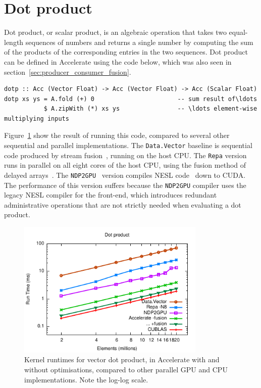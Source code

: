 \section{Dot product}
\label{sec:dotp}

Dot product, or scalar product, is an algebraic operation that takes two
equal-length sequences of numbers and returns a single number by computing the
sum of the products of the corresponding entries in the two sequences. Dot
product can be defined in Accelerate using the code below, which was also seen
in section~\ref{sec:producer_consumer_fusion}.
%
\begin{lstlisting}[style=haskell
    ,label=lst:dotp
    ,caption={Vector dot-product in Accelerate}]
dotp :: Acc (Vector Float) -> Acc (Vector Float) -> Acc (Scalar Float)
dotp xs ys = A.fold (+) 0                       -- sum result of\ldots
           $ A.zipWith (*) xs ys                -- \ldots element-wise multiplying inputs
\end{lstlisting}
%
Figure~\ref{fig:dotp} show the result of running this code, compared to several
other sequential and parallel implementations. The \texttt{Data.Vector} baseline
is sequential code produced by stream
fusion~\cite{Coutts:2007kp}, running on the host CPU. The \texttt{Repa} version
runs in parallel on all eight cores of the host CPU, using the fusion method of
delayed arrays~\cite{Keller:2010er}. The
\texttt{NDP2GPU}~\cite{Bergstrom:2012bi} version compiles NESL
code~\cite{Blelloch:1995ut} down to CUDA. The performance of this version
suffers because the \texttt{NDP2GPU} compiler uses the legacy NESL compiler for
the front-end, which introduces redundant administrative operations that are not
strictly needed when evaluating a dot product.

\begin{figure}
    \begin{center}
        \includegraphics[width=0.8\textwidth]{images/sec-6/dotp/dotp}
    \end{center}
    \caption[Vector dot product kernel benchmarks]{Kernel runtimes for vector
        dot product, in Accelerate with and without optimisations, compared to
        other parallel GPU and CPU implementations. Note the log-log scale.}
    \label{fig:dotp}
\end{figure}

